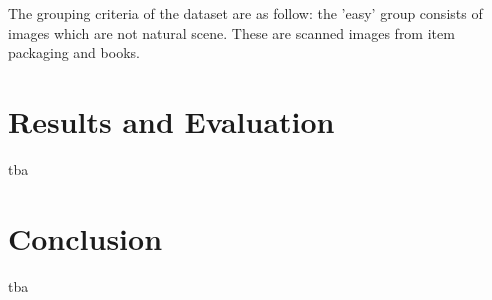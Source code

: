 \documentclass[10pt, a4paper]{article}
\begin{document}
The grouping criteria of the dataset are as follow: the 'easy' group consists of images which are not natural scene. These are scanned images from item packaging and books.

\section{Results and Evaluation} %
\label{sec:evaluation}
tba

\section{Conclusion} %
\label{sec:conclusion}
tba

\newpage 


\end{document}
